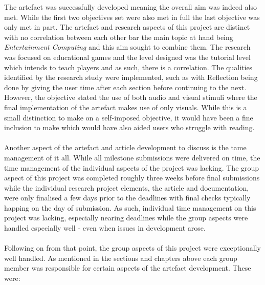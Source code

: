 \noindent The artefact was successfully developed meaning the overall aim was indeed also met. While the first two objectives set were also met in full the last objective was only met in part. The artefact and research aspects of this project are distinct with no correlation between each other bar the main topic at hand being \textit{Entertainment Computing} and this aim sought to combine them. The research was focused on educational games and the level designed was the tutorial level which intends to teach players and as such, there is a correlation. The qualities identified by the research study were implemented, such as with Reflection being done by giving the user time after each section before continuing to the next. However, the objective stated the use of both audio and visual stimuli where the final implementation of the artefact makes use of only visuals. While this is a small distinction to make on a self-imposed objective, it would have been a fine inclusion to make which would have also aided users who struggle with reading.
\\\\
Another aspect of the artefact and article development to discuss is the tame management of it all. While all milestone submissions were delivered on time, the time management of the individual aspects of the project was lacking. The group aspect of this project was completed roughly three weeks before final submissions while the individual research project elements, the article and documentation, were only finalised a few days prior to the deadlines with final checks typically happing on the day of submission. As such, individual time management on this project was lacking, especially nearing deadlines while the group aspects were handled especially well - even when issues in development arose.
\\\\
Following on from that point, the group aspects of this project were exceptionally well handled. As mentioned in the sections and chapters above each group member was responsible for certain aspects of the artefact development. These were: %
